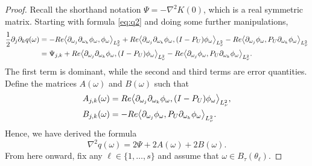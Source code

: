\documentclass[10pt,a4paper]{amsart}
\renewcommand{\Re}{{\rm Re}}
\newcommand{\inner}[1]{{\left\langle#1\right\rangle}}
\begin{document}
	\begin{proof}
	Recall the shorthand notation $\Psi=-\nabla^2 K(0)$, which is a real symmetric matrix. Starting with formula \eqref{eq:q2} and doing some  further manipulations,
	\begin{equation*}
		\begin{split}
			\frac 12 \partial_j \partial_k q(\omega)
			&=-\Re \inner{\partial_{\omega_j} \partial_{\omega_k} \phi_\omega, \phi_\omega}_{L^2_\nu} + \Re \inner{\partial_{\omega_j} \partial_{\omega_k} \phi_\omega, (I-P_U) \phi_\omega}_{L^2_\nu} -\Re \inner{\partial_{\omega_j} \phi_\omega, P_U \partial_{\omega_k} \phi_\omega}_{L^2_\nu} \\ 
			&=\Psi_{j,k} + \Re \inner{\partial_{\omega_j} \partial_{\omega_k} \phi_\omega, (I-P_U) \phi_\omega}_{L^2_\nu} - \Re \inner{\partial_{\omega_j} \phi_\omega, P_U \partial_{\omega_k}\phi_\omega}_{L^2_\nu}.
		\end{split}
	\end{equation*}
	The first term is dominant, while the second and third terms are error quantities. Define the matrices $A(\omega)$ and $B(\omega)$ such that 
	\begin{align*}
		A_{j,k}(\omega)
		&=\Re \inner{\partial_{\omega_j} \partial_{\omega_k} \phi_\omega, (I-P_U) \phi_\omega}_{L^2_\nu} , \\
		B_{j,k}(\omega)
		&=- \Re \inner{\partial_{\omega_j} \phi_\omega, P_U \partial_{\omega_k}\phi_\omega}_{L^2_\nu}. 
	\end{align*}
	Hence, we have derived the formula
	\begin{equation}\label{eq:hessianq}
		\nabla^2 q (\omega) 
		= 2\Psi + 2A(\omega) + 2B(\omega). 
	\end{equation}		
	From here onward, fix any $\ell\in \{1,\dots,s\}$ and assume that $\omega\in B_\tau(\theta_\ell)$. 
	

\end{proof}
\end{document}
